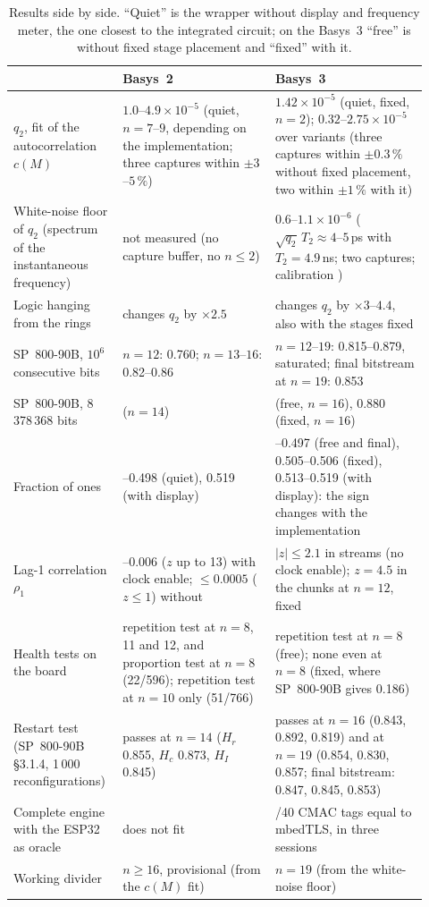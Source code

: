 \begin{table}[htbp]
\centering\small
\caption{Results side by side. ``Quiet'' is the wrapper without display and
frequency meter, the one closest to the integrated circuit; on the Basys~3
``free'' is without fixed stage placement and ``fixed'' with it.}
\label{tab:app_fpga_res}
\begin{tabular}{@{}>{\raggedright\arraybackslash}p{0.22\linewidth}>{\raggedright\arraybackslash}p{0.35\linewidth}>{\raggedright\arraybackslash}p{0.35\linewidth}@{}}
\toprule
 & Basys~2 & Basys~3 \\
\midrule
$q_2$, fit of the autocorrelation $c(M)$ & $1.0$--$4.9\times10^{-5}$
  (quiet, $n = 7$--$9$, depending on the implementation; three captures
  within $\pm3$--$5\,\%$) & $1.42\times10^{-5}$ (quiet, fixed, $n = 2$);
  $0.32$--$2.75\times10^{-5}$ over variants (three captures within
  $\pm0.3\,\%$ without fixed placement, two within $\pm1\,\%$ with it) \\
White-noise floor of $q_2$ (spectrum of the instantaneous frequency) &
  not measured (no capture buffer, no $n \le 2$) & $0.6$--$1.1\times10^{-6}$
  ($\sqrt{q_2}\,T_2 \approx 4$--$5$\,ps with $T_2 = 4.9$\,ns; two
  captures; calibration \simu{}) \\
Logic hanging from the rings & changes $q_2$ by $\times2.5$ & changes $q_2$
  by $\times3$--$4.4$, also with the stages fixed \\
SP~800-90B, $10^6$ consecutive bits & $n = 12$: 0.760; $n = 13$--$16$:
  0.82--0.86 & $n = 12$--$19$: 0.815--0.879, saturated; final bitstream
  at $n = 19$: 0.853 \\
SP~800-90B, 8\,378\,368 bits & 0.890 ($n = 14$) & 0.932 (free, $n = 16$),
  0.880 (fixed, $n = 16$) \\
Fraction of ones & 0.496--0.498 (quiet), 0.519 (with display) &
  0.495--0.497 (free and final), 0.505--0.506 (fixed), 0.513--0.519 (with
  display): the sign changes with the implementation \\
Lag-1 correlation $\rho_1$ & 0.003--0.006 ($z$ up to 13) with clock
  enable; $\le 0.0005$ ($z \le 1$) without & $|z| \le 2.1$ in streams (no
  clock enable); $z = 4.5$ in the chunks at $n = 12$, fixed \\
Health tests on the board & repetition test at $n = 8$, 11 and 12, and
  proportion test at $n = 8$ (22/596); repetition test at $n = 10$ only
  (51/766) & repetition test at $n = 8$ (free); none even at $n = 8$
  (fixed, where SP~800-90B gives 0.186) \\
Restart test (SP~800-90B \S3.1.4, 1\,000 reconfigurations) & passes at
  $n = 14$ ($H_r$ 0.855, $H_c$ 0.873, $H_I$ 0.845) & passes at $n = 16$
  (0.843, 0.892, 0.819) and at $n = 19$ (0.854, 0.830, 0.857; final
  bitstream: 0.847, 0.845, 0.853) \\
Complete engine with the ESP32 as oracle & does not fit & 40/40 \acs{CMAC}
  tags equal to mbedTLS, in three sessions \\
Working divider & $n \ge 16$, provisional (from the $c(M)$ fit) &
  $n = 19$ (from the white-noise floor) \\
\bottomrule
\end{tabular}
\end{table}

